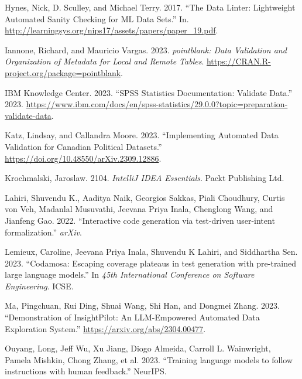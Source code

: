 \documentclass[
  letterpaper,
  DIV=11,
  numbers=noendperiod]{scrartcl}
\newlength{\cslhangindent}
\newlength{\cslentryspacingunit} %
\newenvironment{CSLReferences}[2] %
 {%
  \setlength{\parindent}{0pt}
  \ifodd #1
  \let\oldpar\par
  \def\par{\hangindent=\cslhangindent\oldpar}
  \fi
  \setlength{\parskip}{#2\cslentryspacingunit}
 }%
 {}
\begin{document}
\begin{CSLReferences}{1}{0}
\leavevmode{}%
Hynes, Nick, D. Sculley, and Michael Terry. 2017. {``{The Data Linter:
Lightweight Automated Sanity Checking for ML Data Sets}.''} In.
\url{http://learningsys.org/nips17/assets/papers/paper_19.pdf}.

\leavevmode{}%
Iannone, Richard, and Mauricio Vargas. 2023. \emph{{pointblank: Data
Validation and Organization of Metadata for Local and Remote Tables}}.
\url{https://CRAN.R-project.org/package=pointblank}.

\leavevmode{}%
IBM Knowledge Center. 2023. {``{SPSS Statistics Documentation: Validate
Data}.''} 2023.
\url{https://www.ibm.com/docs/en/spss-statistics/29.0.0?topic=preparation-validate-data}.

\leavevmode{}%
Katz, Lindsay, and Callandra Moore. 2023. {``{Implementing Automated
Data Validation for Canadian Political Datasets}.''}
\url{https://doi.org/10.48550/arXiv.2309.12886}.

\leavevmode{}%
Krochmalski, Jaroslaw. 2104. \emph{{IntelliJ IDEA Essentials}}. Packt
Publishing Ltd.

\leavevmode{}%
Lahiri, Shuvendu K., Aaditya Naik, Georgios Sakkas, Piali Choudhury,
Curtis von Veh, Madanlal Musuvathi, Jeevana Priya Inala, Chenglong Wang,
and Jianfeng Gao. 2022. {``{Interactive code generation via test-driven
user-intent formalization}.''} \emph{{arXiv}}.

\leavevmode{}%
Lemieux, Caroline, Jeevana Priya Inala, Shuvendu K Lahiri, and
Siddhartha Sen. 2023. {``{Codamosa: Escaping coverage plateaus in test
generation with pre-trained large language models}.''} In \emph{45th
International Conference on Software Engineering}. ICSE.

\leavevmode{}%
Ma, Pingchuan, Rui Ding, Shuai Wang, Shi Han, and Dongmei Zhang. 2023.
{``{Demonstration of InsightPilot: An LLM-Empowered Automated Data
Exploration System}.''} \url{https://arxiv.org/abs/2304.00477}.

\leavevmode{}%
Ouyang, Long, Jeff Wu, Xu Jiang, Diogo Almeida, Carroll L. Wainwright,
Pamela Mishkin, Chong Zhang, et al. 2023. {``{Training language models
to follow instructions with human feedback}.''} NeurIPS.


\end{CSLReferences}
\end{document}
